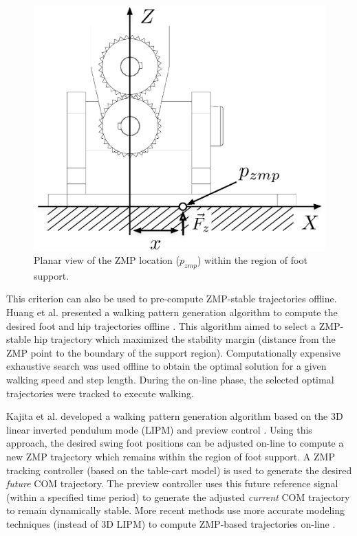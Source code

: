 \begin{figure}[!h]
	\begin{center}
    \includegraphics[scale=0.6]{fig/background/zmpfoot.eps}
	\end{center}
  \caption{Planar view of the ZMP location ($p_{zmp}$) within the region of foot support.}
  \label{fig:zmp}
\end{figure}

This criterion can also be used to pre-compute ZMP-stable trajectories offline. Huang et al. presented a walking pattern generation algorithm to compute the desired foot and hip trajectories offline \cite{HuangEtAlTRA2001}. This algorithm aimed to select a ZMP-stable hip trajectory which maximized the stability margin (distance from the ZMP point to the boundary of the support region). Computationally expensive exhaustive search was used offline to obtain the optimal solution for a given walking speed and step length. During the on-line phase, the selected optimal trajectories were tracked to execute walking.

Kajita et al. developed a walking pattern generation algorithm based on the 3D linear inverted pendulum mode (LIPM) \cite{Kajita:2001fk} and preview control \cite{KajitaEtAlICRA2003}. Using this approach, the desired swing foot positions can be adjusted on-line to compute a new ZMP trajectory which remains within the region of foot support. A ZMP tracking controller (based on the table-cart model) is used to generate the desired \emph{future} COM trajectory. The preview controller uses this future reference signal (within a specified time period) to generate the adjusted \emph{current} COM trajectory to remain dynamically stable. More recent methods use more accurate modeling techniques (instead of 3D LIPM) to compute ZMP-based trajectories on-line \cite{TakenakaEtAlIROS2009}. 

